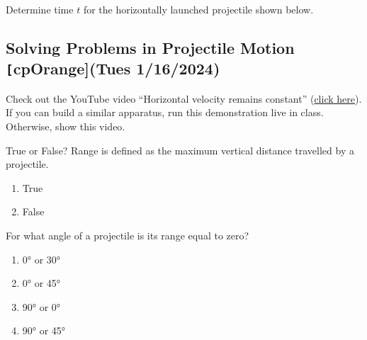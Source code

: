 \documentclass[main-physics.tex]{subfiles}
\begin{document}
\begin{exercise} \label{VllZAi}
    Determine time $t$ for the horizontally launched projectile shown below.
\end{exercise}
    
\begin{center}
\end{center}


\subsection{Solving Problems in Projectile Motion \texttt[cpOrange]{(Tues 1/16/2024)} \label{NruNJk}}

\begin{hook}
    Check out the YouTube video ``Horizontal velocity remains constant'' (\href{https://youtu.be/KacTRPL1MtE}{click here}). If you can build a similar apparatus, run this demonstration live in class. Otherwise, show this video. 
\end{hook}

\begin{warmup}
    \begin{exercise} \label{xj6gln}
        True or False? Range is defined as the maximum vertical distance travelled by a projectile. 
    \end{exercise}
    
    \begin{enumerate}[label=\Alph*.]
        \item True
        \item False
    \end{enumerate}
    
    \begin{exercise} \label{5wfdN0}
        For what angle of a projectile is its range equal to zero?
    \end{exercise}
    
    \begin{enumerate}[label=\Alph*.]
        \item \ang{0} or \ang{30}
        \item \ang{0} or \ang{45}
        \item \ang{90} or \ang{0}
        \item \ang{90} or \ang{45}
    \end{enumerate}
\end{warmup}
\end{document}
